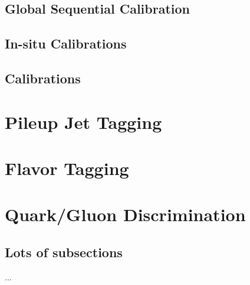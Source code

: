 \subsection{Global Sequential Calibration}

\subsection{In-situ Calibrations}

\subsection{\LargeR Calibrations}




\section{Pileup Jet Tagging}
\label{jet-reconstruction:pileup-jet-tagging}

\section{Flavor Tagging}

\section{Quark/Gluon Discrimination}
	\subsection{Lots of subsections}
		...